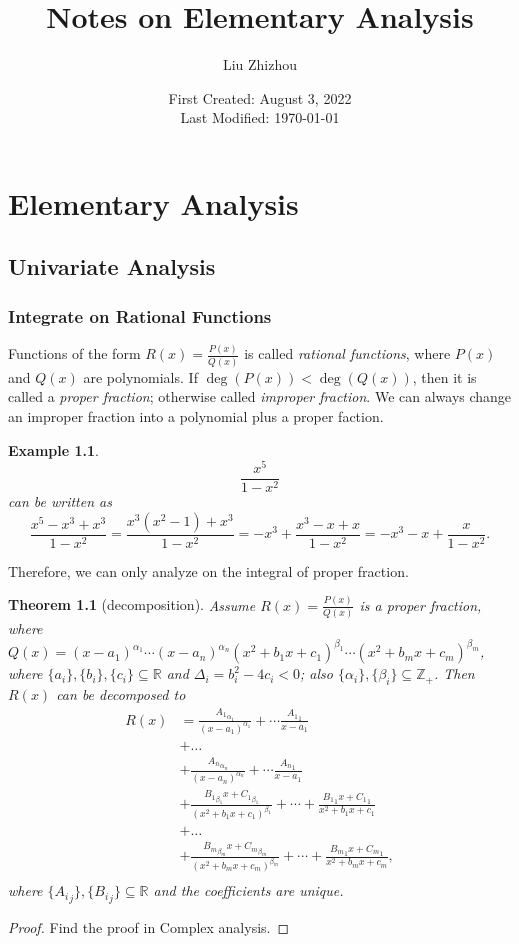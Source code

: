 \documentclass[12pt,a4paper]{report}
\title{Notes on Elementary Analysis}
\author{Liu Zhizhou}
\date{First Created: August 3, 2022\\
	Last Modified: \today}
\numberwithin{equation}{section}
\theoremstyle{mystyle}
\newtheorem{theorem}[definition]{Theorem}
\newtheorem{example}[definition]{Example}
\newcommand{\R}{\mathbb{R}}
\newcommand{\Z}{\mathbb{Z}}
\begin{document}
	{\sffamily \maketitle}
	
	
	\tableofcontents
	\part{Elementary Analysis}
	\chapter{Univariate Analysis}
	
	\section{Integrate on Rational Functions}
	Functions of the form $R(x)=\frac{P(x)}{Q(x)}$ is called \emph{rational functions}, where $P(x)$ and $Q(x)$ are polynomials. If $\deg(P(x))<\deg(Q(x))$, then it is called a \emph{proper fraction}; otherwise called \emph{improper fraction}. We can always change an improper fraction into a polynomial plus a proper faction.
	\begin{example}
		$$\frac{x^5}{1-x^2}$$ can be written as $$\frac{x^5-x^3+x^3}{1-x^2}=\frac{x^3(x^2-1)+x^3}{1-x^2}=-x^3+\frac{x^3-x+x}{1-x^2}=-x^3-x+\frac{x}{1-x^2}.$$
	\end{example}
	Therefore, we can only analyze on the integral of proper fraction.
	\begin{theorem}[decomposition]
		Assume $R(x)=\frac{P(x)}{Q(x)}$ is a proper fraction, where $Q(x)=(x-a_1)^{\alpha_1}\cdots (x-a_n)^{\alpha_n}(x^2+b_1 x+c_1)^{\beta_1}\cdots (x^2+b_m x+c_m)^{\beta_m}$, where $\{a_i\},\{b_i\},\{c_i\}\subseteq \R$ and $\Delta_i = b_i^2-4c_i<0$; also $\{\alpha_i\},\{\beta_i\}\subseteq \Z_+$. Then $R(x)$ can be decomposed to
		\begin{align*}
			R(x)  &=\frac{{A_1}_{\alpha_1}}{(x-a_1)^{\alpha_1}}+\cdots \frac{{A_1}_{1}}{x-a_1}\\
			&+\dots\\
			&+\frac{{A_n}_{\alpha_n}}{(x-a_n)^{\alpha_n}}+\cdots \frac{{A_n}_{1}}{x-a_1}\\
			&+\frac{{B_1}_{\beta_1}x+{C_1}_{\beta_1}}{(x^2+b_1 x+c_1)^{\beta_1}} + \cdots + \frac{{B_1}_{1}x+{C_1}_{1}}{x^2+b_1 x+c_1}\\
			&+\dots\\
			&+\frac{{B_m}_{\beta_m}x+{C_m}_{\beta_m}}{(x^2+b_m x+c_m)^{\beta_m}}+ \cdots + \frac{{B_m}_{1}x+{C_m}_{1}}{x^2+b_m x+c_m},\\
		\end{align*}
		where $\{{A_i}_j\}, \{{B_i}_j\} \subseteq \R$ and the coefficients are unique. 
	\end{theorem}
	\begin{proof}
		Find the proof in Complex analysis.
	\end{proof}
	
\end{document}
